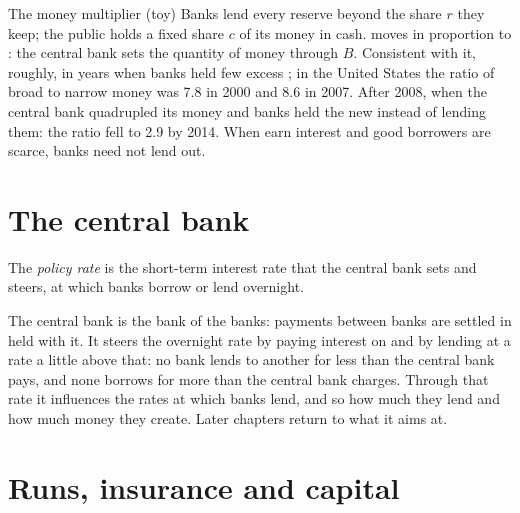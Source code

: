 \begin{model}{The money multiplier (toy)}
\assumes Banks lend every reserve beyond the share $r$ they keep; the public holds a fixed share $c$ of its money in cash.
\predicts {} moves in proportion to : the central bank sets the quantity of money through $B$.
\tested Consistent with it, roughly, in years when banks held few excess ; in the United States the ratio of broad to narrow money was 7.8 in 2000 and 8.6 in 2007.
\breaks After 2008, when the central bank quadrupled its money and banks held the new  instead of lending them: the ratio fell to 2.9 by 2014. When  earn
  interest and good borrowers are scarce, banks need not lend  out.
\end{model}

\section{The central bank}\label{sec:g11:money-and-banking:central-bank}

\begin{definition}\label{def:g11:money-and-banking:policy-rate}
The \emph{policy rate} is the short-term interest rate that the central bank sets and steers, at which banks borrow or lend  overnight.
\end{definition}

The central bank is the bank of the banks: payments between banks are settled in  held with it. It steers the overnight rate by paying interest on  and
by lending  at a rate a little above that: no bank lends  to another for less than the central bank pays, and none borrows for more than the central bank
charges. Through that rate it influences the rates at which banks lend, and so how much they lend and how much money they create. Later chapters return to what it aims at.

\section{Runs, insurance and capital}\label{sec:g11:money-and-banking:runs}

